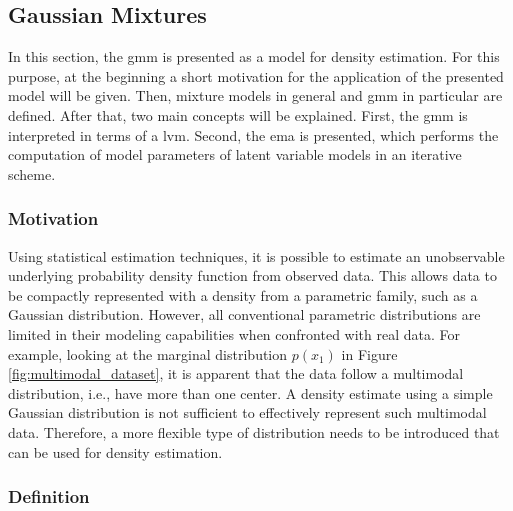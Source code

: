 \subsection{Gaussian Mixtures}

In this section, the \acrshort{gmm} is presented as a model for density estimation. For this purpose, at the beginning a short motivation for the application of the presented model will be given. Then, mixture models in general and \acrshort{gmm} in particular are defined. After that, two main concepts will be explained. First, the \acrshort{gmm} is interpreted in terms of a \acrshort{lvm}. Second, the \acrshort{ema} is presented, which performs the computation of model parameters of latent variable models in an iterative scheme.

\subsubsection{Motivation}
Using statistical estimation techniques, it is possible to estimate an unobservable underlying probability density function from observed data. This allows data to be compactly represented with a density from a parametric family, such as a Gaussian distribution. However, all conventional parametric distributions are limited in their modeling capabilities when confronted with real data. For example, looking at the marginal distribution $p(x_1)$ in Figure \ref{fig:multimodal_dataset}, it is apparent that the data follow a multimodal distribution, i.e., have more than one center. A density estimate using a simple Gaussian distribution is not sufficient to effectively represent such multimodal data. Therefore, a more flexible type of distribution needs to be introduced that can be used for density estimation.


\subsubsection{Definition}

